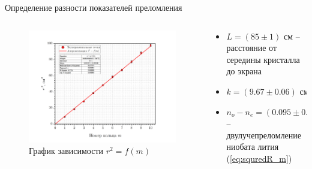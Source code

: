 \documentclass[11pt]{beamer} %
\begin{document}
    \begin{frame}{Определение разности показателей преломления}      
        \begin{columns}
            \begin{column}{0.6\textwidth}
                \begin{figure}
                    \centering
                    \includegraphics[width = \textwidth]{images/graph_squaredR_m.jpg}
                    \caption{График зависимости $r^2 = f(m)$}
                \end{figure}
            \end{column}

            \begin{column}{0.4\textwidth}
                \begin{itemize}
                    \item $ L = (85 \pm 1) \text{ см}$ -- расстояние от середины кристалла до экрана
                    \item $ k = (9.67 \pm 0.06) \text{ см}^2$
                    \item $n_o - n_e = (0.095 \pm 0.002)$ -- двулучепреломление ниобата лития (\ref{eq:squredR_m})
                \end{itemize}
            \end{column}
    \end{columns}
    \end{frame}
\end{document}
